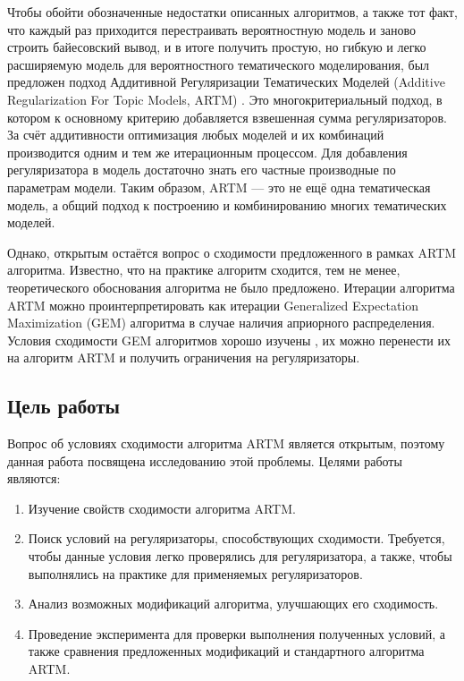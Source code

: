 \documentclass[12pt]{article}
\begin{document}
Чтобы обойти обозначенные недостатки описанных алгоритмов, а также тот факт, что каждый раз приходится перестраивать вероятностную модель и заново строить байесовский вывод, и в итоге получить простую, но гибкую и легко расширяемую модель для вероятностного тематического моделирования, был предложен подход Аддитивной Регуляризации Тематических Моделей (Additive Regularization For Topic Models, ARTM) \cite{artmdef1, artmdef2, artmdef3}. Это многокритериальный подход, в котором к основному критерию добавляется взвешенная сумма регуляризаторов.  За счёт аддитивности оптимизация любых моделей и их комбинаций производится одним и тем же итерационным процессом. Для добавления регуляризатора в модель достаточно знать его частные производные по параметрам модели. Таким образом, ARTM ---  это не ещё одна тематическая модель, а общий подход к построению и комбинированию многих тематических моделей. 

Однако, открытым остаётся вопрос о сходимости предложенного в рамках ARTM алгоритма. Известно, что на практике алгоритм сходится, тем не менее, теоретического обоснования алгоритма не было предложено. Итерации алгоритма ARTM можно проинтерпретировать как итерации Generalized Expectation Maximization (GEM) алгоритма \cite{basegem} в случае наличия априорного распределения. Условия сходимости GEM алгоритмов хорошо изучены \cite{wuem}, их можно перенести их на алгоритм ARTM и получить ограничения на регуляризаторы.

\subsection{Цель работы}
	
Вопрос об условиях сходимости алгоритма ARTM является открытым, поэтому данная работа посвящена исследованию этой проблемы. Целями работы являются:
\begin{enumerate}
\item Изучение свойств сходимости алгоритма ARTM. 
\item Поиск условий на регуляризаторы, способствующих сходимости. Требуется, чтобы данные условия легко проверялись для регуляризатора, а также, чтобы выполнялись на практике для применяемых регуляризаторов.
\item Анализ возможных модификаций алгоритма, улучшающих его сходимость.
\item Проведение эксперимента для проверки выполнения полученных условий, а также сравнения предложенных модификаций и стандартного алгоритма ARTM.
\end{enumerate}
\end{document}

